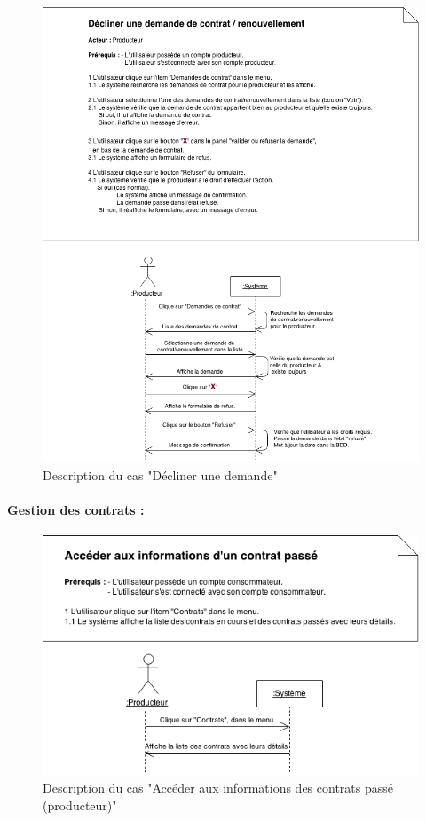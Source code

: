 \documentclass[12pt]{report}
\begin{document}
\begin{figure}[!H]
\centering
\includegraphics[width=1.\textwidth]{./ressources/desc_UC_decliner_demande.png}
\caption{Description du cas "Décliner une demande"}
\end{figure}
\clearpage

\paragraph*{Gestion des contrats :}

\begin{figure}[!H]
\centering
\includegraphics[width=1.\textwidth]{./ressources/desc_UC_contrats_passes.png}
\caption{Description du cas "Accéder aux informations des contrats passé (producteur)"}
\end{figure}
\clearpage
\end{document}

